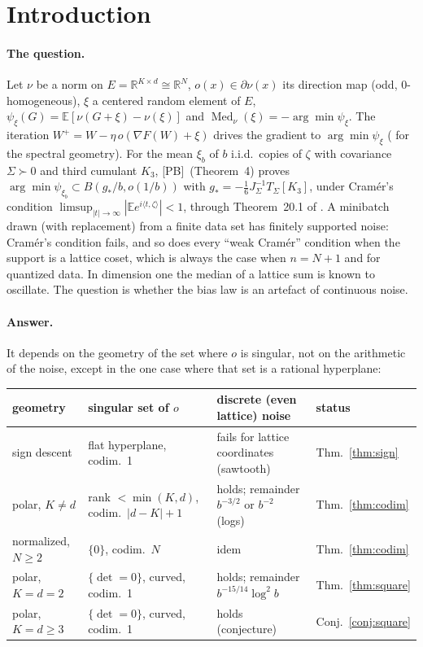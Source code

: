 \documentclass[10pt]{article}
\theoremstyle{definition}
\theoremstyle{remark}
\newcommand{\R}{\mathbb{R}}
\newcommand{\E}{\mathbb{E}}
\newcommand{\inner}[2]{\langle #1, #2\rangle}
\newcommand{\Med}{\operatorname{Med}}
\newcommand{\PB}{\textup{[PB]}}
\begin{document}
\section{Introduction}

\paragraph{The question.} Let $\nu$ be a norm on $E=\R^{K\times d}\cong\R^N$, $o(x)\in\partial\nu(x)$ its direction map
(odd, $0$-homogeneous), $\xi$ a centered random element of $E$, $\psi_\xi(G)=\E[\nu(G+\xi)-\nu(\xi)]$ and
$\Med_\nu(\xi)=-\arg\min\psi_\xi$. The iteration $W^+=W-\eta\,o(\nabla F(W)+\xi)$ drives the gradient to
$\arg\min\psi_\xi$ (\cite[Theorem~2]{manuscript} for the spectral geometry). For the mean $\xi_b$ of $b$ i.i.d.\ copies of
$\zeta$ with covariance $\Sigma\succ0$ and third cumulant $K_3$, \PB\ (Theorem~4) proves
$\arg\min\psi_{\xi_b}\subset B(g_\ast/b,o(1/b))$ with $g_\ast=-\frac16J_\Sigma^{-1}T_\Sigma[K_3]$, under Cram\'er's condition
$\limsup_{|t|\to\infty}|\E e^{i\inner t\zeta}|<1$, through Theorem~20.1 of \cite{br}. A minibatch drawn (with
replacement) from a finite data set has finitely supported noise: Cram\'er's condition fails, and so does every ``weak
Cram\'er'' condition when the support is a lattice coset, which is always the case when $n=N+1$ and for quantized data.
In dimension one the median of a lattice sum is known to oscillate. The question is whether the bias law is an
artefact of continuous noise.

\paragraph{Answer.} It depends on the geometry of the set where $o$ is singular, not on the arithmetic of the noise,
except in the one case where that set is a rational hyperplane:

\begin{center}\footnotesize
\begin{tabular}{@{}llll@{}}
\toprule
geometry & singular set of $o$ & discrete (even lattice) noise & status\\
\midrule
sign descent & flat hyperplane, codim.\ 1 & fails for lattice coordinates (sawtooth) & Thm.~\ref{thm:sign}\\
polar, $K\ne d$ & rank $<\min(K,d)$, codim.\ $|d-K|+1$ & holds; remainder $b^{-3/2}$ or $b^{-2}$ (logs) & Thm.~\ref{thm:codim}\\
normalized, $N\ge2$ & $\{0\}$, codim.\ $N$ & idem & Thm.~\ref{thm:codim}\\
polar, $K=d=2$ & $\{\det=0\}$, curved, codim.\ 1 & holds; remainder $b^{-15/14}\log^2b$ & Thm.~\ref{thm:square}\\
polar, $K=d\ge3$ & $\{\det=0\}$, curved, codim.\ 1 & holds (conjecture) & Conj.~\ref{conj:square}\\
\bottomrule
\end{tabular}
\end{center}
\end{document}
